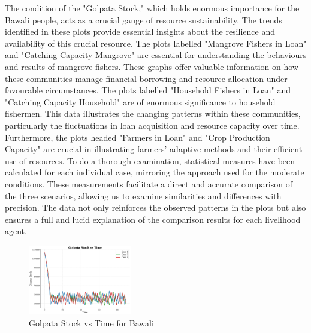 \documentclass[final,5p,times,twocolumn,authoryear]{elsarticle}
\begin{document}
The condition of the "Golpata Stock," which holds enormous importance for the Bawali people, acts as a crucial gauge of resource sustainability. The trends identified in these plots provide essential insights about the resilience and availability of this crucial resource. The plots labelled "Mangrove Fishers in Loan" and "Catching Capacity Mangrove" are essential for understanding the behaviours and results of mangrove fishers. These graphs offer valuable information on how these communities manage financial borrowing and resource allocation under favourable circumstances.
The plots labelled "Household Fishers in Loan" and "Catching Capacity Household" are of enormous significance to household fishermen. This data illustrates the changing patterns within these communities, particularly the fluctuations in loan acquisition and resource capacity over time. Furthermore, the plots headed "Farmers in Loan" and "Crop Production Capacity" are crucial in illustrating farmers' adaptive methods and their efficient use of resources.
To do a thorough examination, statistical measures have been calculated for each individual case, mirroring the approach used for the moderate conditions. These measurements facilitate a direct and accurate comparison of the three scenarios, allowing us to examine similarities and differences with precision. The data not only reinforces the observed patterns in the plots but also ensures a full and lucid explanation of the comparison results for each livelihood agent.\\
\begin{figure}[htbp]
    \centering
    \includegraphics[width=0.4\textwidth]{graph_all/plots_fav/golpata_stock_vs_time.png}
    \caption{Golpata Stock vs Time for Bawali}
    \label{fig:bawali}
\end{figure}
\end{document}
